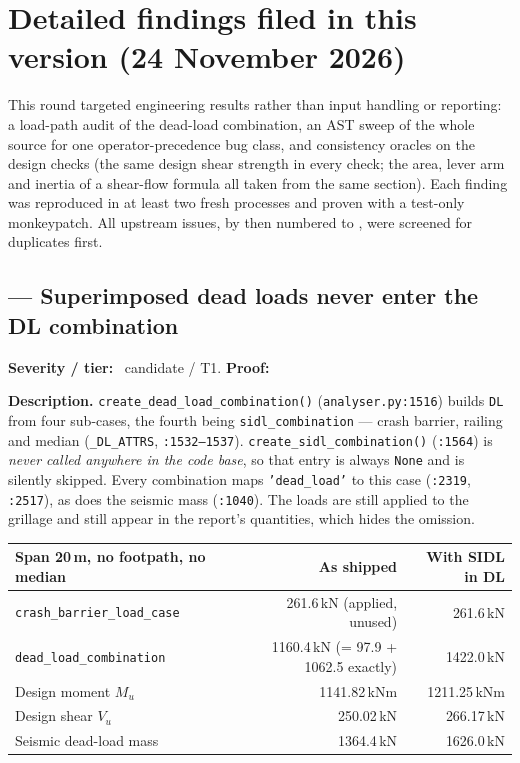 \section{Detailed findings filed in this version (24 November 2026)}

This round targeted engineering results rather than input handling or reporting: a load-path audit of the dead-load combination, an AST sweep of the whole source for one operator-precedence bug class, and consistency oracles on the design checks (the same design shear strength in every check; the area, lever arm and inertia of a shear-flow formula all taken from the same section). Each finding was reproduced in at least two fresh processes and proven with a test-only monkeypatch. All upstream issues, by then numbered to , were screened for duplicates first.

\subsection{ --- Superimposed dead loads never enter the DL combination}
\textbf{Severity / tier:} \sevH\ candidate / T1. \quad \textbf{Proof:} 

\textbf{Description.} \texttt{create\_dead\_load\_combination()} (\texttt{analyser.py:1516}) builds \texttt{DL} from four sub-cases, the fourth being \texttt{sidl\_combination} --- crash barrier, railing and median (\texttt{\_DL\_ATTRS}, \texttt{:1532--1537}). \texttt{create\_sidl\_combination()} (\texttt{:1564}) is \emph{never called anywhere in the code base}, so that entry is always \texttt{None} and is silently skipped. Every combination maps \texttt{'dead\_load'} to this case (\texttt{:2319}, \texttt{:2517}), as does the seismic mass (\texttt{:1040}). The loads are still applied to the grillage and still appear in the report's quantities, which hides the omission.

\begin{center}\begin{tabular}{@{}lrr@{}}
\toprule
Span 20\,m, no footpath, no median & As shipped & With SIDL in DL \\
\midrule
\texttt{crash\_barrier\_load\_case} & 261.6\,kN (applied, unused) & 261.6\,kN \\
\texttt{dead\_load\_combination} & 1160.4\,kN (= 97.9 + 1062.5 exactly) & 1422.0\,kN \\
Design moment $M_u$ & 1141.82\,kNm & 1211.25\,kNm \\
Design shear $V_u$ & 250.02\,kN & 266.17\,kN \\
Seismic dead-load mass & 1364.4\,kN & 1626.0\,kN \\
\bottomrule
\end{tabular}\end{center}

